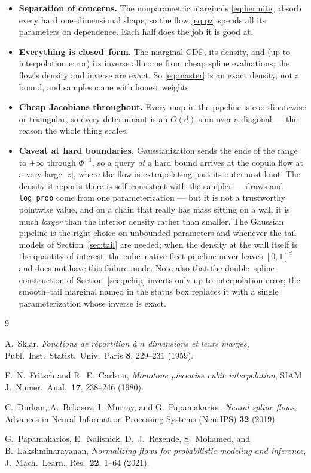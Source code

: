 \documentclass[11pt]{article}
\theoremstyle{remark}
\begin{document}
\begin{itemize}
\item \textbf{Separation of concerns.} The nonparametric marginals \eqref{eq:hermite}
absorb every hard one--dimensional shape, so the flow \eqref{eq:pz} spends all its
parameters on dependence. Each half does the job it is good at.
\item \textbf{Everything is closed--form.} The marginal CDF, its density, and (up
to interpolation error) its inverse all come from cheap spline evaluations; the
flow's density and inverse are exact. So \eqref{eq:master} is an exact density,
not a bound, and samples come with honest weights.
\item \textbf{Cheap Jacobians throughout.} Every map in the pipeline is
coordinatewise or triangular, so every determinant is an $O(d)$ sum over a
diagonal --- the reason the whole thing scales.
\item \textbf{Caveat at hard boundaries.} Gaussianization sends the ends of the
range to $\pm\infty$ through $\Phi^{-1}$, so a query \emph{at} a hard bound
arrives at the copula flow at a very large $|z|$, where the flow is
extrapolating past its outermost knot. The density it reports there is
self--consistent with the sampler --- draws and \texttt{log\_prob} come from one
parameterization --- but it is not a trustworthy pointwise value, and on a chain
that really has mass sitting on a wall it is much \emph{larger} than the
interior density rather than smaller. The Gaussian pipeline is the right choice
on unbounded parameters and whenever the tail models of
Section~\ref{sec:tail} are needed; when the density at the wall itself is the
quantity of interest, the cube--native fleet pipeline never leaves $[0,1]^d$ and
does not have this failure mode. Note also that the double--spline construction
of Section~\ref{sec:pchip} inverts only up to interpolation error; the
smooth--tail marginal named in the status box replaces it with a
single parameterization whose inverse is exact.
\end{itemize}

\begin{thebibliography}{9}

A.~Sklar,
\emph{Fonctions de r\'epartition \`a $n$ dimensions et leurs marges},
Publ.\ Inst.\ Statist.\ Univ.\ Paris \textbf{8}, 229--231 (1959).

F.~N.~Fritsch and R.~E.~Carlson,
\emph{Monotone piecewise cubic interpolation},
SIAM J.\ Numer.\ Anal.\ \textbf{17}, 238--246 (1980).

C.~Durkan, A.~Bekasov, I.~Murray, and G.~Papamakarios,
\emph{Neural spline flows},
Advances in Neural Information Processing Systems (NeurIPS) \textbf{32} (2019).

G.~Papamakarios, E.~Nalisnick, D.~J.~Rezende, S.~Mohamed, and
B.~Lakshminarayanan,
\emph{Normalizing flows for probabilistic modeling and inference},
J.\ Mach.\ Learn.\ Res.\ \textbf{22}, 1--64 (2021).

\end{thebibliography}
\end{document}
